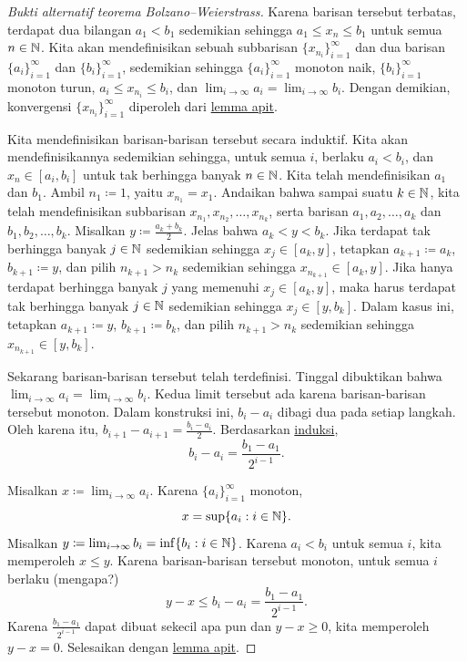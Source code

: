 \begin{proof}[Bukti alternatif teorema Bolzano--Weierstrass]
Karena barisan tersebut terbatas, terdapat dua bilangan $a_1 < b_1$
sedemikian sehingga $a_1 \leq x_n \leq b_1$ untuk semua $n \in {\mathbb{N}}$.
Kita akan mendefinisikan sebuah subbarisan $\{ x_{n_i} \}_{i=1}^\infty$ dan dua
barisan $\{ a_i \}_{i=1}^\infty$ dan $\{ b_i \}_{i=1}^\infty$, sedemikian sehingga
$\{ a_i \}_{i=1}^\infty$ monoton naik, $\{ b_i \}_{i=1}^\infty$ monoton turun,
$a_i \leq x_{n_i} \leq b_i$, dan $\lim_{i\to\infty} a_i =
\lim_{i\to\infty} b_i$.   Dengan demikian,
konvergensi $\{ x_{n_i} \}_{i=1}^\infty$ diperoleh dari \hyperref[squeeze:lemma]{lemma apit}.

Kita mendefinisikan barisan-barisan tersebut secara induktif.  Kita akan mendefinisikannya
sedemikian sehingga, untuk semua $i$, berlaku $a_i < b_i$,
dan $x_n \in [a_i,b_i]$ untuk tak berhingga banyak $n \in {\mathbb{N}}$.
Kita telah mendefinisikan $a_1$ dan $b_1$.  Ambil $n_1 \coloneqq 1$, yaitu
$x_{n_1} = x_1$.
Andaikan bahwa sampai suatu $k \in {\mathbb{N}}$,
kita telah mendefinisikan subbarisan $x_{n_1}, x_{n_2}, \ldots,
x_{n_k}$, serta barisan $a_1,a_2,\ldots,a_k$
dan $b_1,b_2,\ldots,b_k$.
Misalkan $y \coloneqq \frac{a_k+b_k}{2}$.
Jelas bahwa
$a_k < y < b_k$.  Jika terdapat tak berhingga banyak $j \in {\mathbb{N}}$
sedemikian sehingga $x_j \in [a_k,y]$, tetapkan $a_{k+1} \coloneqq a_k$, $b_{k+1}
\coloneqq y$,
dan pilih $n_{k+1} > n_{k}$
sedemikian sehingga $x_{n_{k+1}} \in [a_k,y]$.  Jika hanya terdapat berhingga banyak
$j$ yang memenuhi
$x_j \in [a_k,y]$, maka harus terdapat tak berhingga banyak $j \in
{\mathbb{N}}$ sedemikian sehingga
$x_j \in [y,b_k]$.  Dalam kasus ini, tetapkan $a_{k+1} \coloneqq y$, $b_{k+1}
\coloneqq b_k$,
dan pilih $n_{k+1} > n_{k}$
sedemikian sehingga $x_{n_{k+1}} \in [y,b_k]$.

Sekarang barisan-barisan tersebut telah terdefinisi.  Tinggal dibuktikan bahwa
$\lim_{i\to\infty} a_i = \lim_{i\to\infty} b_i$.  Kedua limit tersebut ada karena barisan-barisan
tersebut monoton.  Dalam konstruksi ini,
$b_i - a_i$ dibagi dua pada setiap langkah.  Oleh karena itu,
$b_{i+1} - a_{i+1} = \frac{b_i-a_i}{2}$.  Berdasarkan
\hyperref[induction:thm]{induksi},
\begin{equation*}
b_i - a_i = \frac{b_1-a_1}{2^{i-1}} .
\end{equation*}

Misalkan $x \coloneqq \lim_{i\to\infty} a_i$.  Karena $\{ a_i \}_{i=1}^\infty$ monoton,
\begin{equation*}
x = \sup \{ a_i : i \in {\mathbb{N}} \} .
\end{equation*}
Misalkan $y \coloneqq \lim_{i\to\infty} b_i = \inf \{ b_i : i \in {\mathbb{N}} \}$.  Karena $a_i < b_i$ untuk
semua $i$, kita memperoleh $x \leq y$.
Karena barisan-barisan tersebut monoton, untuk semua $i$ berlaku (mengapa?)
\begin{equation*}
y-x \leq b_i-a_i = \frac{b_1-a_1}{2^{i-1}} .
\end{equation*}
Karena $\frac{b_1-a_1}{2^{i-1}}$ dapat dibuat sekecil apa pun dan $y-x \geq 0$,
kita memperoleh $y-x = 0$.  Selesaikan dengan \hyperref[squeeze:lemma]{lemma apit}.
\end{proof}

